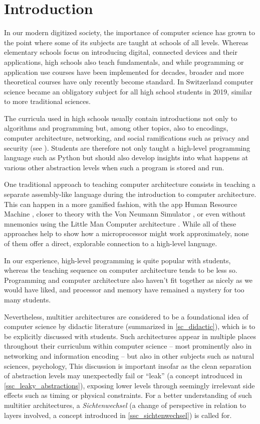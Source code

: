 
\chapter{Introduction}

In our modern digitized society, the importance of computer science has grown to the point where some of its subjects are taught at schools of all levels. Whereas elementary schools focus on introducing digital, connected devices and their applications, high schools also teach fundamentals, and while programming or application use courses have been implemented for decades, broader and more theoretical courses have only recently become standard. In Switzerland \eg computer science became an obligatory subject for all high school students in 2019, similar to more traditional sciences.

The curricula used in high schools usually contain introductions not only to algorithms and programming but, among other topics, also to encodings, computer architecture, networking, and social ramifications such as privacy and security (see \eg \cite{Erz16}). Students are therefore not only taught a high-level programming language such as Python but should also develop insights into what happens at various other abstraction levels when such a program is stored and run.

One traditional approach to teaching computer architecture consists in teaching a separate assembly-like language during the introduction to computer architecture. This can happen in a more gamified fashion, \eg with the app Human Resource Machine \cite{Tom15}, closer to theory with the Von Neumann Simulator \cite{Gan23}, or even without mnemonics using the Little Man Computer architecture \cite{Oin25}. While all of these approaches help to show how a microprocessor might work approximately, none of them offer a direct, explorable connection to a high-level language.

In our experience, high-level programming is quite popular with students, whereas the teaching sequence on computer architecture tends to be less so. Programming and computer architecture also haven't fit together as nicely as we would have liked, and processor and memory have remained a mystery for too many students.

Nevertheless, multitier architectures are considered to be a foundational idea of computer science by didactic literature (summarized in \ref{sc_didactic}), which is to be explicitly discussed with students. Such architectures appear in multiple places throughout their curriculum within computer science -- most prominently also in networking and information encoding -- but also in other subjects such as natural sciences, psychology, \etc This discussion is important insofar as the clean separation of abstraction levels may unexpectedly fail or ``leak'' (a concept introduced in \ref{ssc_leaky_abstractions}), exposing lower levels through seemingly irrelevant side effects such as timing or physical constraints. For a better understanding of such multitier architectures, a \emph{Sichtenwechsel} (\ie a change of perspective in relation to layers involved, a concept introduced in \ref{ssc_sichtenwechsel}) is called for.

